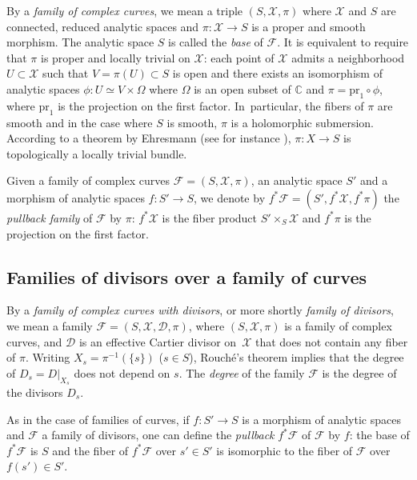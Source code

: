 \documentclass[10pt]{amsart}
\newcommand{\C}{\mathbb C}
\newcommand{\pr}{\mathrm{pr}}
\theoremstyle{definition}
\theoremstyle{plain}
\begin{document}
By a \emph{family of complex curves}, we mean a triple $(S, \mathcal X, \pi)$ where $\mathcal X$ and $S$ are connected, reduced analytic spaces and $\pi: \mathcal X \to S$ is a proper and smooth morphism.
The analytic space $S$ is called the \emph{base} of $\mathcal F$.
It is equivalent to require that $\pi$ is proper and locally trivial on $\mathcal X$: each point of $\mathcal X$ admits a neighborhood $U \subset \mathcal X$ such that $V = \pi(U) \subset S$ is open and there exists an isomorphism of analytic spaces $\phi: U \simeq V \times \Omega$ where $\Omega$ is an open subset of $\C$ and $\pi = \pr_1 \circ \phi$, where $\pr_1$ is the projection on the first factor. In~particular, the fibers of $\pi$ are smooth and in the case where $S$ is smooth, $\pi$ is a holomorphic submersion.
According to a theorem by Ehresmann (see for instance \cite{voisin_en_I}), $\pi: X \to S$ is topologically a locally trivial bundle.

Given a family of complex curves $\mathcal F = (S, \mathcal X, \pi)$, an analytic space $S'$ and a morphism of analytic spaces $f: S' \to S$, we denote by $f^*\mathcal F = \left(S', f^* \mathcal X, f^* \pi\right)$ the \emph{pullback family} of $\mathcal F$ by $\pi$: $f^*\mathcal X$ is the fiber product $S' \times_S \mathcal X$ and $f^*\pi$ is the projection on the first factor.

\subsection{Families of divisors over a family of curves}\label{subsection_families_divisors}

By a \emph{family of complex curves with divisors}, or more shortly \emph{family of divisors}, we mean a family $\mathcal F = (S, \mathcal X, \mathcal D, \pi)$, where $(S, \mathcal X, \pi)$ is a family of complex curves, and $\mathcal D$ is an effective Cartier divisor on~$\mathcal X$ that does not contain any fiber of $\pi$.
Writing $X_s = \pi^{-1}(\{s\})$ ($s \in S$), Rouché's theorem implies that the degree of $D_s = D|_{X_s}$ does not depend on $s$.
The \emph{degree} of the family $\mathcal F$ is the degree of the divisors $D_s$.

As in the case of families of curves, if $f: S' \to S$ is a morphism of analytic spaces and $\mathcal F$ a family of divisors, one can define the \emph{pullback} $f^*\mathcal F$ of $\mathcal F$ by $f$: the base of $f^*\mathcal F$ is $S$ and the fiber of $f^* \mathcal F$ over $s' \in S'$ is isomorphic to the fiber of $\mathcal F$ over $f(s') \in S'$.
\end{document}
